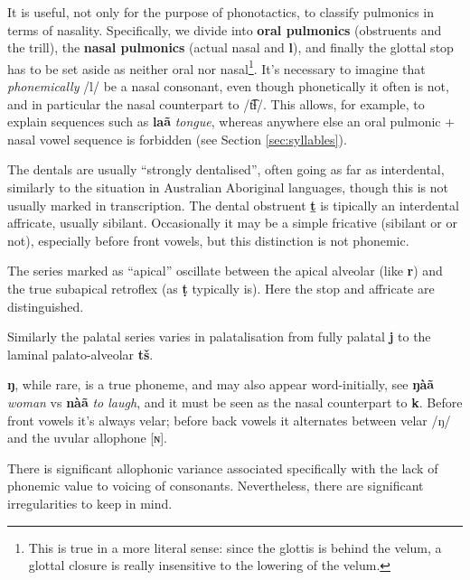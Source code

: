 \documentclass[11pt,a5paper]{book}
\newcommand{\qcn}[1]{\textcolor{AccentText}{\large\textbf{#1}}}
\newcommand{\transl}[2]{\qcn{#1} \emph{#2}}
\begin{document}
It is useful, not only for the purpose of phonotactics, to classify pulmonics in terms of nasality. Specifically, we divide into \textbf{oral pulmonics} (obstruents and the trill), the \textbf{nasal pulmonics} (actual nasal and \qcn{l}), and finally the glottal stop has to be set aside as neither oral nor nasal\footnote{This is true in a more literal sense: since the glottis is behind the velum, a glottal closure is really insensitive to the lowering of the velum.}. It's necessary to imagine that \emph{phonemically} /l/ be a nasal consonant, even though phonetically it often is not, and in particular the nasal counterpart to /t͡ɬ/. This allows, for example, to explain sequences such as \transl{laã}{tongue}, whereas anywhere else an oral pulmonic + nasal vowel sequence is forbidden (see Section \ref{sec:syllables}).

The dentals are usually ``strongly dentalised'', often going as far as interdental, similarly to the situation in Australian Aboriginal languages, though this is not usually marked in transcription. The dental obstruent \qcn{ṯ} is tipically an interdental affricate, usually sibilant. Occasionally it may be a simple fricative (sibilant or or not), especially before front vowels, but this distinction is not phonemic.

The series marked as ``apical'' oscillate between the apical alveolar (like \qcn{r}) and the true subapical retroflex (as \qcn{ṭ} typically is). Here the stop and affricate are distinguished.

Similarly the palatal series varies in palatalisation from fully palatal \qcn{j} to the laminal palato-alveolar \qcn{tš}.

\qcn{ŋ}, while rare, is a true phoneme, and may also appear word-initially, see \transl{ŋàã}{woman} vs \transl{nàã}{to laugh}, and it must be seen as the nasal counterpart to \qcn{k}. Before front vowels it's always velar; before back vowels it alternates between velar /ŋ/ and the uvular allophone [ɴ].



There is significant allophonic variance associated specifically with the lack of phonemic value to voicing of consonants. Nevertheless, there are significant irregularities to keep in mind.
\end{document}
